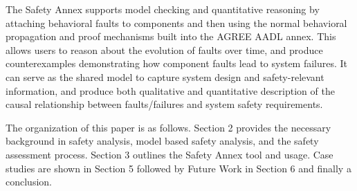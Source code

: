 The Safety Annex supports model checking and quantitative reasoning by attaching behavioral faults to components and then using the normal behavioral propagation and proof mechanisms built into the AGREE AADL annex. This allows users to reason about the evolution of faults over time, and produce counterexamples demonstrating how component faults lead to system failures. It can serve as the shared model to capture system design and safety-relevant information, and produce both qualitative and quantitative description of the causal relationship between faults/failures and system safety requirements.

The organization of this paper is as follows. Section 2 provides the necessary background in safety analysis, model based safety analysis, and the safety assessment process. Section 3 outlines the Safety Annex tool and usage. Case studies are shown in Section 5 followed by Future Work in Section 6 and finally a conclusion. 


%
